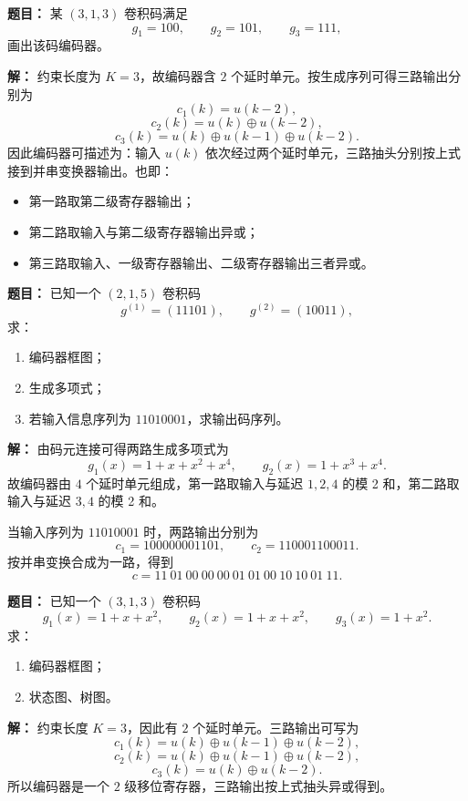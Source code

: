 \medskip
{}
\textbf{题目：}
某 $(3,1,3)$ 卷积码满足
\[
g_1=100,\qquad g_2=101,\qquad g_3=111,
\]
画出该码编码器。

\par\textbf{解：}
约束长度为 $K=3$，故编码器含 $2$ 个延时单元。按生成序列可得三路输出分别为
\[
c_1(k)=u(k-2),
\]
\[
c_2(k)=u(k)\oplus u(k-2),
\]
\[
c_3(k)=u(k)\oplus u(k-1)\oplus u(k-2).
\]
因此编码器可描述为：输入 $u(k)$ 依次经过两个延时单元，三路抽头分别按上式接到并串变换器输出。也即：
\begin{itemize}
\item 第一路取第二级寄存器输出；
\item 第二路取输入与第二级寄存器输出异或；
\item 第三路取输入、一级寄存器输出、二级寄存器输出三者异或。
\end{itemize}

\medskip
{}
\textbf{题目：}
已知一个 $(2,1,5)$ 卷积码
\[
g^{(1)}=(11101),\qquad g^{(2)}=(10011),
\]
求：
\begin{enumerate}
\item 编码器框图；
\item 生成多项式；
\item 若输入信息序列为 $11010001$，求输出码序列。
\end{enumerate}

\par\textbf{解：}
由码元连接可得两路生成多项式为
\[
g_1(x)=1+x+x^2+x^4,
\qquad
g_2(x)=1+x^3+x^4.
\]
故编码器由 $4$ 个延时单元组成，第一路取输入与延迟 $1,2,4$ 的模 2 和，第二路取输入与延迟 $3,4$ 的模 2 和。

当输入序列为 $11010001$ 时，两路输出分别为
\[
c_1=100000001101,
\qquad
c_2=110001100011.
\]
按并串变换合成为一路，得到
\[
c=11\ 01\ 00\ 00\ 00\ 01\ 01\ 00\ 10\ 10\ 01\ 11.
\]

\medskip
{}
\textbf{题目：}
已知一个 $(3,1,3)$ 卷积码
\[
g_1(x)=1+x+x^2,\qquad
g_2(x)=1+x+x^2,\qquad
g_3(x)=1+x^2.
\]
求：
\begin{enumerate}
\item 编码器框图；
\item 状态图、树图。
\end{enumerate}

\par\textbf{解：}
约束长度 $K=3$，因此有 $2$ 个延时单元。三路输出可写为
\[
c_1(k)=u(k)\oplus u(k-1)\oplus u(k-2),
\]
\[
c_2(k)=u(k)\oplus u(k-1)\oplus u(k-2),
\]
\[
c_3(k)=u(k)\oplus u(k-2).
\]
所以编码器是一个 $2$ 级移位寄存器，三路输出按上式抽头异或得到。


